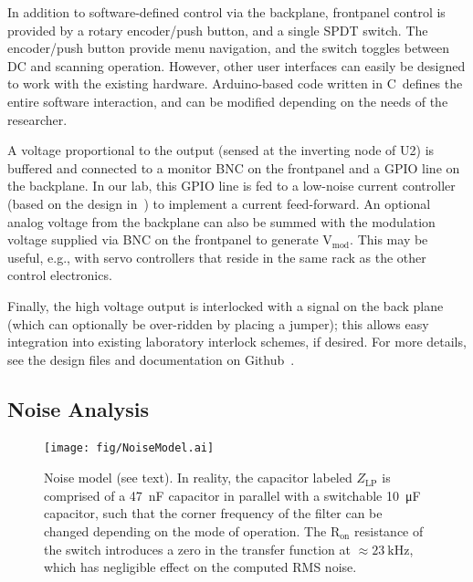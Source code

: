 \documentclass[aip,rsi,reprint]{revtex4-1} %
\newcommand{\CC}{{C\nolinebreak[4]\hspace{-.05em}\raisebox{.4ex}{\tiny\bf ++}}~}
\begin{document}
In addition to software-defined control via the backplane, frontpanel control is provided by a rotary encoder/push button, and a single SPDT switch.
The encoder/push button provide menu navigation, and the switch toggles between DC and scanning operation.
However, other user interfaces can easily be designed to work with the existing hardware.
Arduino-based code written in \CC defines the entire software interaction, and can be modified depending on the needs of the researcher.

A voltage proportional to the output (sensed at the inverting node of U2) is buffered and connected to a monitor BNC on the frontpanel and a GPIO line on the backplane.
In our lab, this GPIO line is fed to a low-noise current controller (based on the design in~\cite{Erickson2008a}) to implement a current feed-forward.
An optional analog voltage from the backplane can also be summed with the modulation voltage supplied via BNC on the frontpanel to generate $\text{V}_{\text{mod}}$.
This may be useful, e.g., with servo controllers that reside in the same rack as the other control electronics.

Finally, the high voltage output is interlocked with a signal on the back plane (which can optionally be over-ridden by placing a jumper); this allows easy integration into existing laboratory interlock schemes, if desired.
For more details, see the design files and documentation on Github~\cite{DesignFiles}.



\subsection{Noise Analysis}
\label{Sec:NoiseAnalysis}

\begin{figure}[t]
\texttt{[image: fig/NoiseModel.ai]}
\caption{Noise model (see text). In reality, the capacitor labeled $Z_\text{LP}$ is comprised of a \SI{47}{\nano\farad} capacitor in parallel with a switchable \SI{10}{\micro\farad} capacitor, such that the corner frequency of the filter can be changed depending on the mode of operation. The $\text{R}_\text{on}$ resistance of the switch introduces a zero in the transfer function at $\approx\SI{23}{\kilo\hertz}$, which has negligible effect on the computed RMS noise. \label{Fig:NoiseModel}}
\end{figure}
\end{document}
